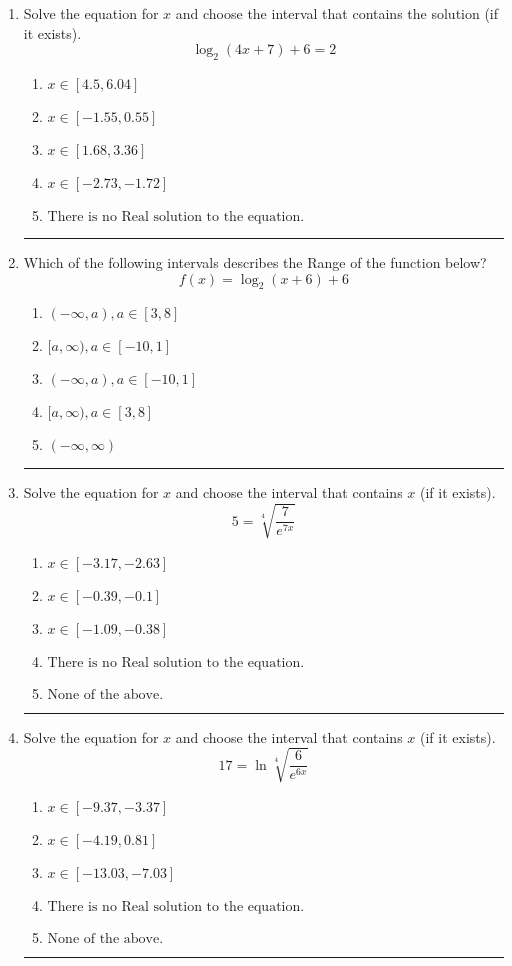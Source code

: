 \documentclass[14pt]{extbook}
\newcommand{\litem}[1]{\item#1\hspace*{-1cm}\rule{\textwidth}{0.4pt}}
\begin{document}
\begin{enumerate}
\litem{
Solve the equation for $x$ and choose the interval that contains the solution (if it exists).\[ \log_{2}{(4x+7)}+6 = 2 \]\begin{enumerate}[label=\Alph*.]
\item \( x \in [4.5, 6.04] \)
\item \( x \in [-1.55, 0.55] \)
\item \( x \in [1.68, 3.36] \)
\item \( x \in [-2.73, -1.72] \)
\item \( \text{There is no Real solution to the equation.} \)

\end{enumerate} }
\litem{
Which of the following intervals describes the Range of the function below?\[ f(x) = \log_2{(x+6)}+6 \]\begin{enumerate}[label=\Alph*.]
\item \( (-\infty, a), a \in [3, 8] \)
\item \( [a, \infty), a \in [-10, 1] \)
\item \( (-\infty, a), a \in [-10, 1] \)
\item \( [a, \infty), a \in [3, 8] \)
\item \( (-\infty, \infty) \)

\end{enumerate} }
\litem{
 Solve the equation for $x$ and choose the interval that contains $x$ (if it exists).\[  5 = \sqrt[4]{\frac{7}{e^{7x}}} \]\begin{enumerate}[label=\Alph*.]
\item \( x \in [-3.17, -2.63] \)
\item \( x \in [-0.39, -0.1] \)
\item \( x \in [-1.09, -0.38] \)
\item \( \text{There is no Real solution to the equation.} \)
\item \( \text{None of the above.} \)

\end{enumerate} }
\litem{
 Solve the equation for $x$ and choose the interval that contains $x$ (if it exists).\[  17 = \ln{\sqrt[4]{\frac{6}{e^{6x}}}} \]\begin{enumerate}[label=\Alph*.]
\item \( x \in [-9.37, -3.37] \)
\item \( x \in [-4.19, 0.81] \)
\item \( x \in [-13.03, -7.03] \)
\item \( \text{There is no Real solution to the equation.} \)
\item \( \text{None of the above.} \)


\end{enumerate}}
\end{enumerate}
\end{document}
